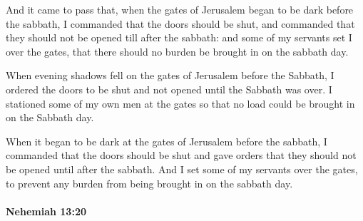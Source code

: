 			\begin{versebox}
					\item[BHS] 
					\item[LXX] 
					\item[ASV] And it came to pass that, when the gates of Jerusalem began to be dark before the sabbath, I commanded that the doors should be shut, and commanded that they should not be opened till after the sabbath: and some of my servants set I over the gates, that there should no burden be brought in on the sabbath day.
					\item[NIV] When evening shadows fell on the gates of Jerusalem before the Sabbath, I ordered the doors to be shut and not opened until the Sabbath was over. I stationed some of my own men at the gates so that no load could be brought in on the Sabbath day.
					\item[NRSV] When it began to be dark at the gates of Jerusalem before the sabbath, I commanded that the doors should be shut and gave orders that they should not be opened until after the sabbath. And I set some of my servants over the gates, to prevent any burden from being brought in on the sabbath day.
			\end{versebox}

		\paragraph{Nehemiah 13:20} %
			\label{NEHEMIAH-13-20}

